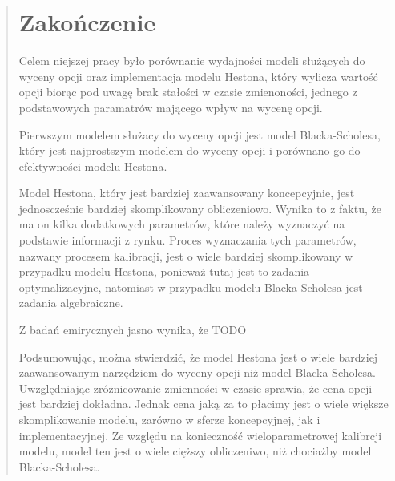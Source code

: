 \documentclass{pracamgr}
\begin{document}
\begin{quote}


 \chapter*{Zakończenie}\label{r:ending}

Celem niejszej pracy było porównanie wydajności modeli służących do wyceny
opcji oraz implementacja modelu Hestona, który wylicza wartość opcji biorąc
pod uwagę brak stałości w czasie zmienoności, jednego z podstawowych paramatrów
mającego wpływ na wycenę opcji. 

Pierwszym modelem służacy do wyceny opcji jest model Blacka-Scholesa, który jest
najprostszym modelem do wyceny opcji i porównano go do efektywności modelu 
Hestona. 

Model Hestona, który jest bardziej zaawansowany koncepcyjnie, jest jednoscześnie 
bardziej skomplikowany obliczeniowo. Wynika to z faktu, że ma on kilka dodatkowych
parametrów, które należy wyznaczyć na podstawie informacji z rynku. Proces wyznaczania tych 
parametrów, nazwany procesem kalibracji, jest o wiele bardziej skomplikowany w przypadku 
modelu Hestona, ponieważ tutaj jest to zadania optymalizacyjne, natomiast w przypadku modelu
Blacka-Scholesa jest zadania algebraiczne.


Z badań emirycznych jasno wynika, że TODO


Podsumowując, można stwierdzić, że model Hestona jest o wiele bardziej zaawansowanym
narzędziem do wyceny opcji niż model Blacka-Scholesa. Uwzględniając zróżnicowanie zmienności 
w czasie sprawia, że cena opcji jest bardziej dokładna. Jednak cena jaką za to płacimy 
jest o wiele większe skomplikowanie modelu, zarówno w sferze koncepcyjnej, jak i 
implementacyjnej. Ze względu na konieczność wieloparametrowej kalibrcji modelu, 
model ten jest o wiele cięższy obliczeniwo, niż chociażby model Blacka-Scholesa.


\appendix


 

\end{quote}
\end{document}
